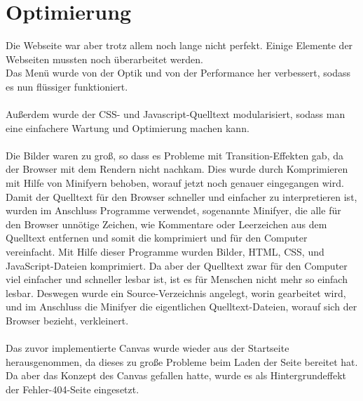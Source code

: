 \section{Optimierung}
Die Webseite war aber trotz allem noch lange nicht perfekt. Einige Elemente der Webseiten mussten noch überarbeitet werden. 
\\
Das Menü wurde von der Optik und von der Performance her verbessert, sodass es nun flüssiger funktioniert.  
\\
\\
Außerdem wurde der CSS- und Javascript-Quelltext modularisiert, sodass man eine einfachere Wartung und Optimierung machen kann.
\\
\\
Die Bilder waren zu groß, so dass es Probleme mit Transition-Effekten gab, da der Browser mit dem Rendern nicht nachkam. Dies wurde durch Komprimieren mit Hilfe von Minifyern behoben, worauf jetzt noch genauer eingegangen wird.
\\
Damit der Quelltext für den Browser schneller und einfacher zu interpretieren ist, wurden im Anschluss Programme verwendet, sogenannte Minifyer, die alle für den Browser unnötige Zeichen, wie Kommentare oder Leerzeichen aus dem Quelltext entfernen und somit die komprimiert und für den Computer vereinfacht. Mit Hilfe dieser Programme wurden Bilder, HTML, CSS, und JavaScript-Dateien komprimiert. Da aber der Quelltext zwar für den Computer viel einfacher und schneller lesbar ist, ist es für Menschen nicht mehr so einfach lesbar. Deswegen wurde ein Source-Verzeichnis angelegt, worin gearbeitet wird, und im Anschluss die Minifyer die eigentlichen Quelltext-Dateien, worauf sich der Browser bezieht, verkleinert.
\\
\\
Das zuvor implementierte Canvas wurde wieder aus der Startseite herausgenommen, da dieses zu große Probleme beim Laden der Seite bereitet hat. Da aber das Konzept des Canvas gefallen hatte, wurde es als Hintergrundeffekt der Fehler-404-Seite eingesetzt.
